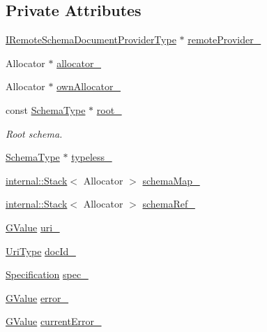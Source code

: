 \subsection*{Private Attributes}
\begin{DoxyCompactItemize}
\item 
\hyperlink{classGenericSchemaDocument_aa53ca323efce50f88aea6fa0d03e9785}{I\+Remote\+Schema\+Document\+Provider\+Type} $\ast$ \hyperlink{classGenericSchemaDocument_ae71c9925eaf2f51f26ce1083d3f4edf4}{remote\+Provider\+\_\+}
\item 
Allocator $\ast$ \hyperlink{classGenericSchemaDocument_a8a7df889c7e1deab679c1ee165ba59f0}{allocator\+\_\+}
\item 
Allocator $\ast$ \hyperlink{classGenericSchemaDocument_a95ba649b2911b91297321093876f1cab}{own\+Allocator\+\_\+}
\item 
const \hyperlink{classGenericSchemaDocument_acaf115202b159a2eb72c97c3dc6c3895}{Schema\+Type} $\ast$ \hyperlink{classGenericSchemaDocument_a50ee80c40478d090c98900d4e6949737}{root\+\_\+}
\begin{DoxyCompactList}\small\item\em Root schema. \end{DoxyCompactList}\item 
\hyperlink{classGenericSchemaDocument_acaf115202b159a2eb72c97c3dc6c3895}{Schema\+Type} $\ast$ \hyperlink{classGenericSchemaDocument_a7393ecd4d607c1f81ce9eac5becf92a8}{typeless\+\_\+}
\item 
\hyperlink{classinternal_1_1Stack}{internal\+::\+Stack}$<$ Allocator $>$ \hyperlink{classGenericSchemaDocument_a75a97c9f8cd1cc8cd67f3b6364d93744}{schema\+Map\+\_\+}
\item 
\hyperlink{classinternal_1_1Stack}{internal\+::\+Stack}$<$ Allocator $>$ \hyperlink{classGenericSchemaDocument_a0c3ee68d07de1c96f1954ad66c6e6d23}{schema\+Ref\+\_\+}
\item 
\hyperlink{classGenericSchemaDocument_a777505b09fff6cf23b8cfed9e0350eec}{G\+Value} \hyperlink{classGenericSchemaDocument_ab5574f32bd1778690ac0d2cb992c1eaf}{uri\+\_\+}
\item 
\hyperlink{classGenericSchemaDocument_afcfefaab7eecec6849d478557392e23c}{Uri\+Type} \hyperlink{classGenericSchemaDocument_ab6b6e5654c0563a3ece3ae7a970c0f0f}{doc\+Id\+\_\+}
\item 
\hyperlink{structSpecification}{Specification} \hyperlink{classGenericSchemaDocument_a1e844ef6ec640afa79f184c0484aa7d1}{spec\+\_\+}
\item 
\hyperlink{classGenericSchemaDocument_a777505b09fff6cf23b8cfed9e0350eec}{G\+Value} \hyperlink{classGenericSchemaDocument_ac5acc747fac790c69ae35fd4b62e3aa6}{error\+\_\+}
\item 
\hyperlink{classGenericSchemaDocument_a777505b09fff6cf23b8cfed9e0350eec}{G\+Value} \hyperlink{classGenericSchemaDocument_a0829007785ae6f16ff45a9d3d844628f}{current\+Error\+\_\+}
\end{DoxyCompactItemize}
